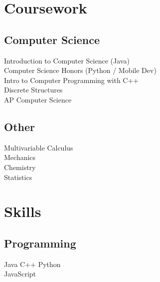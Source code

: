 \documentclass[]{deedy-resume-openfont}
\begin{document}
\begin{minipage}[t]{0.33\textwidth}
\section{Coursework}
\subsection{Computer Science}
Introduction to Computer Science (Java) \\
Computer Science Honors (Python / Mobile Dev) \\
Intro to Computer Programming with C++ \\
Discrete Structures \\
AP Computer Science \\
\sectionsep

\subsection{Other}
Multivariable Calculus \\
Mechanics \\
Chemistry \\
Statistics \\

\sectionsep


\section{Skills}
\subsection{Programming}
Java \textbullet{} C++ \textbullet{} Python \\
JavaScript
\sectionsep

%
%

\end{minipage} 
\hfill
\end{document}
